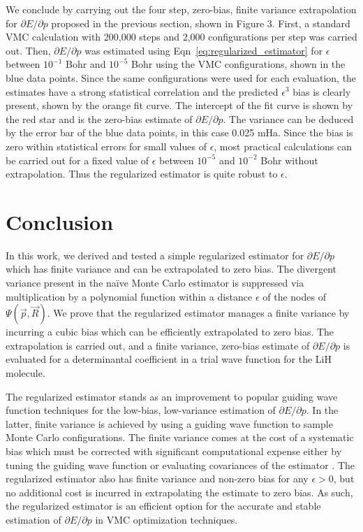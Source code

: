 \documentclass[twocolumn]{revtex4-1}
\begin{document}
We conclude by carrying out the four step, zero-bias, finite variance extrapolation for $\partial E/\partial p$ proposed in the previous section, shown in Figure 3.
First, a standard VMC calculation with 200,000 steps and 2,000 configurations per step was carried out.
Then, $\partial E/\partial p$ was estimated using Eqn~\ref{eq:regularized_estimator} for $\epsilon$ between $10^{-1}$ Bohr and $10^{-5}$ Bohr using the VMC configurations, shown in the blue data points.
Since the same configurations were used for each evaluation, the estimates have a strong statistical correlation and the predicted $\epsilon^3$ bias is clearly present, shown by the orange fit curve.
The intercept of the fit curve is shown by the red star and is the zero-bias estimate of $\partial E/\partial p$.
The variance can be deduced by the error bar of the blue data points, in this case 0.025 mHa.
Since the bias is zero within statistical errors for small values of $\epsilon$, most practical calculations can be carried out for a fixed value of $\epsilon$ between $10^{-5}$ and $10^{-2}$ Bohr without extrapolation.
Thus the regularized estimator is quite robust to $\epsilon$.

\section{Conclusion}
In this work, we derived and tested a simple regularized estimator for $\partial E/\partial p$ which has finite variance and can be extrapolated to zero bias.
The divergent variance present in the na\"ive Monte Carlo estimator is suppressed via multiplication by a polynomial function within a distance $\epsilon$ of the nodes of $\Psi(\vec{p}, \vec{R})$. 
We prove that the regularized estimator manages a finite variance by incurring a cubic bias which can be efficiently extrapolated to zero bias.
The extrapolation is carried out, and a finite variance, zero-bias estimate of $\partial E/\partial p$ is evaluated for a determinantal coefficient in a trial wave function for the LiH molecule.

The regularized estimator stands as an improvement to popular guiding wave function techniques \cite{Avella, Attaccalite2008, Zen2013, Assaraf1999, doi:10.1063/1.1286598, Assaraf2003} for the low-bias, low-variance estimation of $\partial E/\partial p$.
In the latter, finite variance is achieved by using a guiding wave function to sample Monte Carlo configurations.
The finite variance comes at the cost of a systematic bias which must be corrected with significant computational expense either by tuning the guiding wave function or evaluating covariances of the estimator \cite{ Toulouse2015}.
The regularized estimator also has finite variance and non-zero bias for any $\epsilon > 0$, but no additional cost is incurred in extrapolating the estimate to zero bias.
As such, the regularized estimator is an efficient option for the accurate and stable estimation of $\partial E/\partial p$ in VMC optimization techniques.
\end{document}
